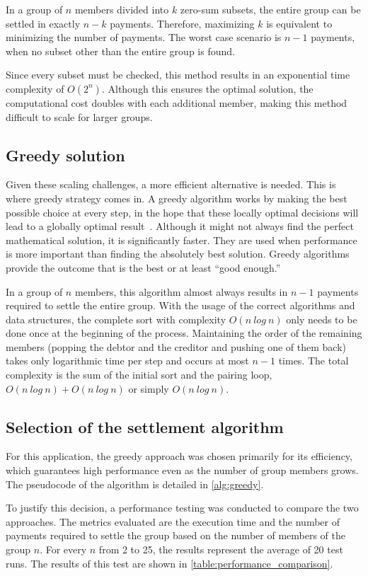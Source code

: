 \documentclass{ctuthesis}
\begin{document}
In a group of $n$ members divided into $k$ zero-sum subsets, the entire group can be settled in exactly $n-k$ payments. Therefore, maximizing $k$ is equivalent to minimizing the number of payments. The worst case scenario is $n-1$ payments, when no subset other than the entire group is found.

Since every subset must be checked, this method results in an exponential time complexity of $O(2^n)$. Although this ensures the optimal solution, the computational cost doubles with each additional member, making this method difficult to scale for larger groups.

\subsection{Greedy solution}
Given these scaling challenges, a more efficient alternative is needed. This is where greedy strategy comes in. A greedy algorithm works by making the best possible choice at every step, in the hope that these locally optimal decisions will lead to a globally optimal result~\cite{CLRS}. Although it might not always find the perfect mathematical solution, it is significantly faster. They are used when performance is more important than finding the absolutely best solution. Greedy algorithms provide the outcome that is the best or at least ``good  enough.''

In a group of $n$ members, this algorithm almost always results in $n-1$ payments required to settle the entire group. With the usage of the correct algorithms and data structures, the complete sort with complexity $O(n\ log\ n)$ only needs to be done once at the beginning of the process. Maintaining the order of the remaining members (popping the debtor and the creditor and pushing one of them back) takes only logarithmic time per step and occurs at most $n-1$ times. The total complexity is the sum of the initial sort and the pairing loop, $O(n\ log\ n) + O(n\ log\ n)$ or simply $O(n\ log\ n)$.

\subsection{Selection of the settlement algorithm}
For this application, the greedy approach was chosen primarily for its efficiency, which guarantees high performance even as the number of group members grows. The pseudocode of the algorithm is detailed in \autoref{alg:greedy}.

To justify this decision, a performance testing was conducted to compare the two approaches. The metrics evaluated are the execution time and the number of payments required to settle the group based on the number of members of the group $n$. For every $n$ from 2 to 25, the results represent the average of 20 test runs. The results of this test are shown in \autoref{table:performance_comparison}.
\end{document}
